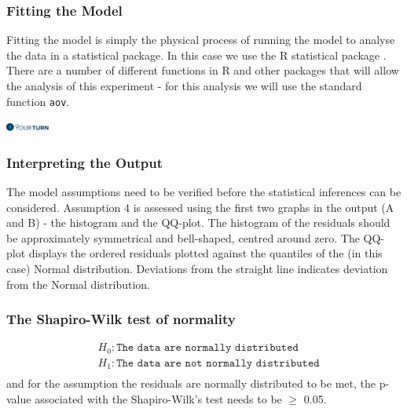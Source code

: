 \begin{frame}\frametitle{Fitting the Model}
Fitting the model is simply the physical process of running the model to analyse the data in a statistical package. In
this case we use the R statistical package \cite{r}. There are a number of different functions in R and other packages
that will allow the analysis of this experiment - for this analysis we will use the standard function \texttt{aov}.

\vspace{3cm}
\flushright
\includegraphics[height = 0.3cm]{yourturn}

\end{frame}



\begin{frame}\frametitle{Interpreting the Output}
The model assumptions need to be verified before the statistical inferences can be considered. Assumption 4 is assessed
using the first two graphs in the output (A and B) - the histogram and the QQ-plot. The histogram of the residuals
should be approximately symmetrical and bell-shaped, centred around zero. The QQ-plot displays the ordered residuals
plotted against the quantiles of the (in this case) Normal distribution. Deviations from the straight line indicates
deviation from the Normal distribution.

\end{frame}



\begin{frame}\frametitle{The Shapiro-Wilk test of normality}
\begin{align*}
& H_0: \texttt{The data are normally distributed}\\
& H_1: \texttt{The data are not normally distributed}\\
\end{align*}
and for the assumption the residuals are normally distributed to be met, the p-value associated with the Shapiro-Wilk's
test needs to be $\ge$ 0.05.

\end{frame}



